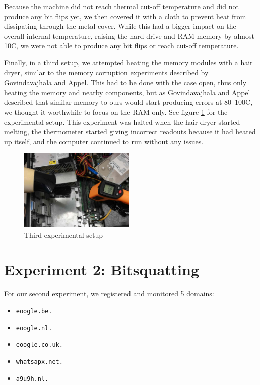 \documentclass[conference]{IEEEtran}
\begin{document}
Because the machine did not reach thermal cut-off temperature and did not
produce any bit flips yet, we then covered it with a cloth to prevent heat from
dissipating through the metal cover. While this had a bigger impact on the
overall internal temperature, raising the hard drive and RAM memory by almost
10\degree{}C, we were not able to produce any bit flips or reach cut-off
temperature.

Finally, in a third setup, we attempted heating the memory modules with a hair
dryer, similar to the memory corruption experiments described by Govindavajhala
and Appel\cite{jvm}. This had to be done with the case open, thus only heating
the memory and nearby components, but as Govindavajhala and Appel described
that similar memory to ours would start producing errors at 80--100\degree{}C,
we thought it worthwhile to focus on the RAM only. See figure
\ref{fig:hairdryer} for the experimental setup. This experiment was halted when
the hair dryer started melting, the thermometer started giving incorrect
readouts because it had heated up itself, and the computer continued to run
without any issues.

\begin{figure}
	\centering
	\includegraphics[width=0.49\textwidth]{hairdryer.jpg}
	\caption{Third experimental setup}
	\label{fig:hairdryer}
\end{figure}


\section{Experiment 2: Bitsquatting}

For our second experiment, we registered and monitored 5 domains:

\begin{itemize}
  \item \texttt{eoogle.be.}
  \item \texttt{eoogle.nl.}
  \item \texttt{eoogle.co.uk.}
  \item \texttt{whatsapx.net.}
  \item \texttt{a9u9h.nl.}
\end{itemize}
\end{document}
